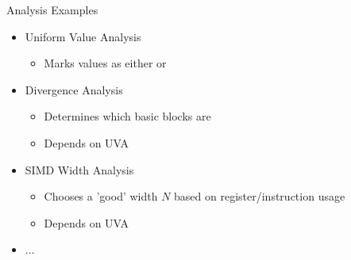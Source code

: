 \begin{frame}{Analysis Examples}

\begin{itemize}
    \item Uniform Value Analysis
    \begin{itemize}
        \item Marks values as either  or 
    \end{itemize}

    \item Divergence Analysis
    \begin{itemize}
        \item Determines which basic blocks are 
        \item Depends on UVA
    \end{itemize}
    
    \item SIMD Width Analysis
    \begin{itemize}
        \item Chooses a 'good' width $N$ based on register/instruction usage
        \item Depends on UVA
    \end{itemize}
    
    \item ...
\end{itemize}

\end{frame}


